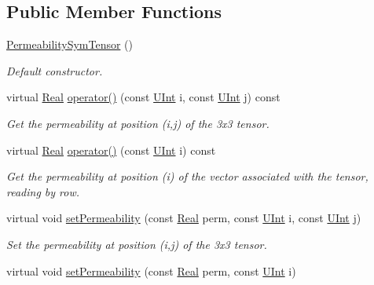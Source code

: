 \subsection*{Public Member Functions}
\begin{DoxyCompactItemize}
\item 
\hyperlink{classFVCode3D_1_1PermeabilitySymTensor_a0d2bf26d1004acb312c4dff7ee4b71f1}{Permeability\+Sym\+Tensor} ()
\begin{DoxyCompactList}\small\item\em Default constructor. \end{DoxyCompactList}\item 
virtual \hyperlink{namespaceFVCode3D_a40c1f5588a248569d80aa5f867080e83}{Real} \hyperlink{classFVCode3D_1_1PermeabilitySymTensor_ae8b671c423d58279ff87c67d9bf617ef}{operator()} (const \hyperlink{namespaceFVCode3D_a4bf7e328c75d0fd504050d040ebe9eda}{U\+Int} i, const \hyperlink{namespaceFVCode3D_a4bf7e328c75d0fd504050d040ebe9eda}{U\+Int} j) const 
\begin{DoxyCompactList}\small\item\em Get the permeability at position (i,j) of the 3x3 tensor. \end{DoxyCompactList}\item 
virtual \hyperlink{namespaceFVCode3D_a40c1f5588a248569d80aa5f867080e83}{Real} \hyperlink{classFVCode3D_1_1PermeabilitySymTensor_af536697b5e88e9d05f3886ac5e7dd3e1}{operator()} (const \hyperlink{namespaceFVCode3D_a4bf7e328c75d0fd504050d040ebe9eda}{U\+Int} i) const 
\begin{DoxyCompactList}\small\item\em Get the permeability at position (i) of the vector associated with the tensor, reading by row. \end{DoxyCompactList}\item 
virtual void \hyperlink{classFVCode3D_1_1PermeabilitySymTensor_a82f66a215fa06295c3094f7452152167}{set\+Permeability} (const \hyperlink{namespaceFVCode3D_a40c1f5588a248569d80aa5f867080e83}{Real} perm, const \hyperlink{namespaceFVCode3D_a4bf7e328c75d0fd504050d040ebe9eda}{U\+Int} i, const \hyperlink{namespaceFVCode3D_a4bf7e328c75d0fd504050d040ebe9eda}{U\+Int} j)
\begin{DoxyCompactList}\small\item\em Set the permeability at position (i,j) of the 3x3 tensor. \end{DoxyCompactList}\item 
virtual void \hyperlink{classFVCode3D_1_1PermeabilitySymTensor_a4f8605ba43b6ffccfa69e4db9b6f929a}{set\+Permeability} (const \hyperlink{namespaceFVCode3D_a40c1f5588a248569d80aa5f867080e83}{Real} perm, const \hyperlink{namespaceFVCode3D_a4bf7e328c75d0fd504050d040ebe9eda}{U\+Int} i)

\end{DoxyCompactItemize}
